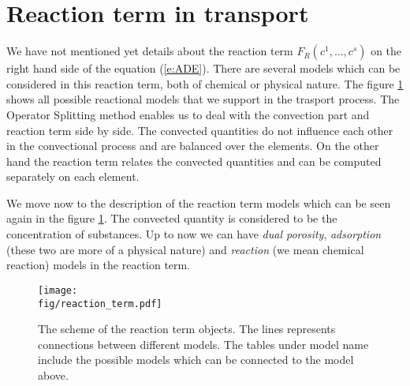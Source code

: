 \def\abs#1{\lvert#1\rvert}
\def\argdot{{\hspace{0.18em}\cdot\hspace{0.18em}}}
\def\avg#1{\left\{#1\right\}_\omega}
\def\D{{\tn D}}
\def\div{\operatorname{div}}
\def\Eh{\mathcal E_h}       %
\def\Ehcom{\mathcal E_{h,C}}         %
\def\Ehdir{\mathcal E_{h,D}}         %
\def\Ehint{\mathcal E_{h,I}}       %
\def\grad{\nabla}
\def\jmp#1{[#1]}
\def\n{\vc n}
\def\vc#1{\mathbf{\boldsymbol{#1}}}     %
\def\R{\mathbb R}
\def\sc#1#2{\left(#1,#2\right)}
\def\Th{\mathcal T_h}       %
\def\th{\vartheta}
\def\tn#1{{\mathbb{#1}}}    %
\def\Tr{\operatorname{Tr}}
\def\where{\,|\,}

\section{Reaction term in transport}
\label{sec:reaction_term}

We have not mentioned yet details about the reaction term $F_R(c^1,\ldots,c^s)$ on the right hand side of the equation (\ref{e:ADE}).
There are several models which can be considered in this reaction term, both of chemical or physical nature. 
The figure \ref{fig:reaction_term} shows all possible reactional models that we support in the trasport process. The Operator Splitting method enables 
us to deal with the convection part and reaction term side by side. The convected quantities do not influence each other in the convectional
process and are balanced over the elements. On the other hand the reaction term relates the convected quantities and can be computed 
separately on each element.

We move now to the description of the reaction term models which can be seen again in the figure \ref{fig:reaction_term}. 
The convected quantity is considered to be the concentration of substances. 
Up to now we can have \emph{dual porosity}, \emph{adsorption} (these two are more of a physical nature) and \emph{reaction} (we mean chemical 
reaction) models in the reaction term. 

\begin{figure}
  \centering
  \texttt{[image: \\fig/reaction\_term.pdf]}
  \caption{The scheme of the reaction term objects. The lines represents connections between different models. 
  The tables under model name include the possible models which can be connected to the model above.}
  \label{fig:reaction_term}
\end{figure}

